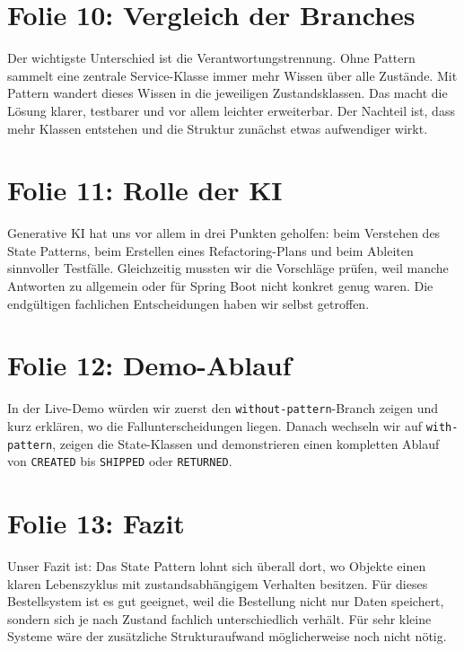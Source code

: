 \documentclass[a4paper,11pt]{article}
\begin{document}
\section*{Folie 10: Vergleich der Branches}
Der wichtigste Unterschied ist die Verantwortungstrennung. Ohne Pattern sammelt eine zentrale Service-Klasse immer mehr Wissen über alle Zustände. Mit Pattern wandert dieses Wissen in die jeweiligen Zustandsklassen. Das macht die Lösung klarer, testbarer und vor allem leichter erweiterbar. Der Nachteil ist, dass mehr Klassen entstehen und die Struktur zunächst etwas aufwendiger wirkt.

\section*{Folie 11: Rolle der KI}
Generative KI hat uns vor allem in drei Punkten geholfen: beim Verstehen des State Patterns, beim Erstellen eines Refactoring-Plans und beim Ableiten sinnvoller Testfälle. Gleichzeitig mussten wir die Vorschläge prüfen, weil manche Antworten zu allgemein oder für Spring Boot nicht konkret genug waren. Die endgültigen fachlichen Entscheidungen haben wir selbst getroffen.

\section*{Folie 12: Demo-Ablauf}
In der Live-Demo würden wir zuerst den \texttt{without-pattern}-Branch zeigen und kurz erklären, wo die Fallunterscheidungen liegen. Danach wechseln wir auf \texttt{with-pattern}, zeigen die State-Klassen und demonstrieren einen kompletten Ablauf von \texttt{CREATED} bis \texttt{SHIPPED} oder \texttt{RETURNED}.

\section*{Folie 13: Fazit}
Unser Fazit ist: Das State Pattern lohnt sich überall dort, wo Objekte einen klaren Lebenszyklus mit zustandsabhängigem Verhalten besitzen. Für dieses Bestellsystem ist es gut geeignet, weil die Bestellung nicht nur Daten speichert, sondern sich je nach Zustand fachlich unterschiedlich verhält. Für sehr kleine Systeme wäre der zusätzliche Strukturaufwand möglicherweise noch nicht nötig.
\end{document}
